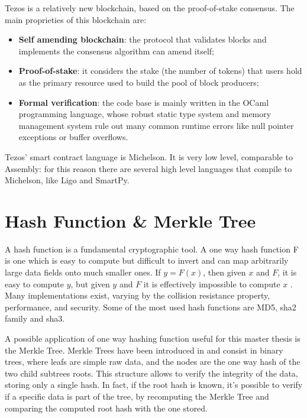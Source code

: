 Tezos \cite{allombert_introduction_2019} is a relatively new blockchain, based on the proof-of-stake consensus. The main proprieties of this blockchain are:
\begin{itemize}
      \item \textbf{Self amending blockchain}: the protocol that validates blocks and implements the consensus algorithm can amend itself;
            \vspace{-0.11in}
      \item \textbf{Proof-of-stake}: it considers the stake (the number of tokens) that users hold as the primary resource used to build the pool of block producers;
            \vspace{-0.11in}
      \item \textbf{Formal verification}: the code base is mainly written in the OCaml programming language, whose robust static type system and memory management system rule out many common runtime errors like null pointer exceptions or buffer overflows.
\end{itemize}

Tezos' smart contract language is Michelson. It is very low level, comparable to Assembly: for this reason there are several high level languages that compile to Michelson, like Ligo and SmartPy.

\section{Hash Function \& Merkle Tree}

A hash function is a fundamental cryptographic tool. A one way hash function F is one which is easy to compute but difficult to invert and can map arbitrarily large data fields onto much smaller ones. If $y = F(x)$, then given $x$ and $F$, it is easy to compute $y$, but given $y$ and $F$ it is effectively impossible to compute $x$ \cite{merkle_secrecy_1979}. Many implementations exist, varying by the collision resistance property, performance, and security. Some of the most used hash functions are MD5, sha2 family and sha3.

A possible application of one way hashing function useful for this master thesis is the Merkle Tree. Merkle Trees have been introduced in \cite{merkle_secrecy_1979} and consist in binary trees, where leafs are simple raw data, and the nodes are the one way hash of the two child subtrees roots. This structure allows to verify the integrity of the data, storing only a single hash. In fact, if the root hash is known, it's possible to verify if a specific data is part of the tree, by recomputing the Merkle Tree and comparing the computed root hash with the one stored.


